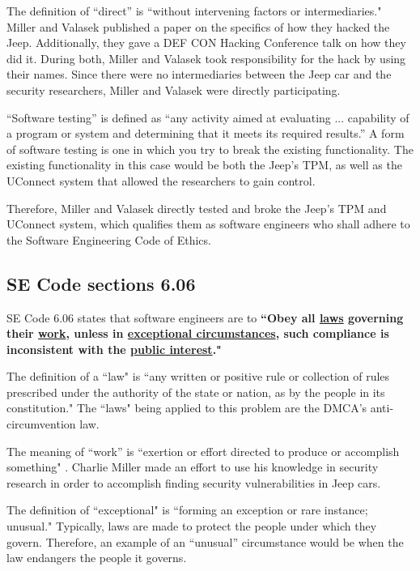 \documentclass[12pt]{article}
\begin{document}
\begin{multicols}{2}
The definition of ``direct'' is ``without intervening factors or intermediaries."\cite{dictionary}
Miller and Valasek published a paper on the specifics of how they hacked the Jeep. \cite{officialPaper} Additionally, they gave a DEF CON Hacking Conference talk on how they did it. \cite{youtube} During both, Miller and Valasek took responsibility for the hack by using their names.\cite{officialPaper}\cite{youtube} Since there were no intermediaries between the Jeep car and the security researchers, Miller and Valasek were directly participating. 

``Software testing'' is defined as ``any activity aimed at evaluating ... capability of a program or system and determining that it meets its required results.''\cite{softwareTesting} A form of software testing is one in which you try to break the existing functionality. \cite{softwareTesting}\cite{breakTests} The existing functionality in this case would be both the Jeep's TPM, as well as the UConnect system that allowed the researchers to gain control. 

Therefore, Miller and Valasek directly tested and broke the Jeep's TPM and UConnect system, which qualifies them as software engineers who shall adhere to the Software Engineering Code of Ethics.

\subsection{SE Code sections 6.06}
SE Code 6.06 states that software engineers are to \textbf{``Obey all \underline{laws} governing their \underline{work}, unless in \underline{exceptional circumstances}, such compliance is inconsistent with the \underline{public interest}."} \cite{seCode}

The definition of a ``law" is ``any written or positive rule or collection of rules prescribed under the authority of the state or nation, as by the people in its constitution."\cite{dictionary} The ``laws" being applied to this problem are the DMCA's anti-circumvention law. 

The meaning of ``work'' is ``exertion or effort directed to produce or accomplish something" \cite{dictionary}. Charlie Miller made an effort to use his knowledge in security research in order to accomplish finding security vulnerabilities in Jeep cars.\cite{officialPaper}

The definition of ``exceptional" is ``forming an exception or rare instance; unusual." \cite{dictionary} Typically, laws are made to protect the people under which they govern. Therefore, an example of an ``unusual'' circumstance would be when the law endangers the people it governs.


\end{multicols}
\end{document}
